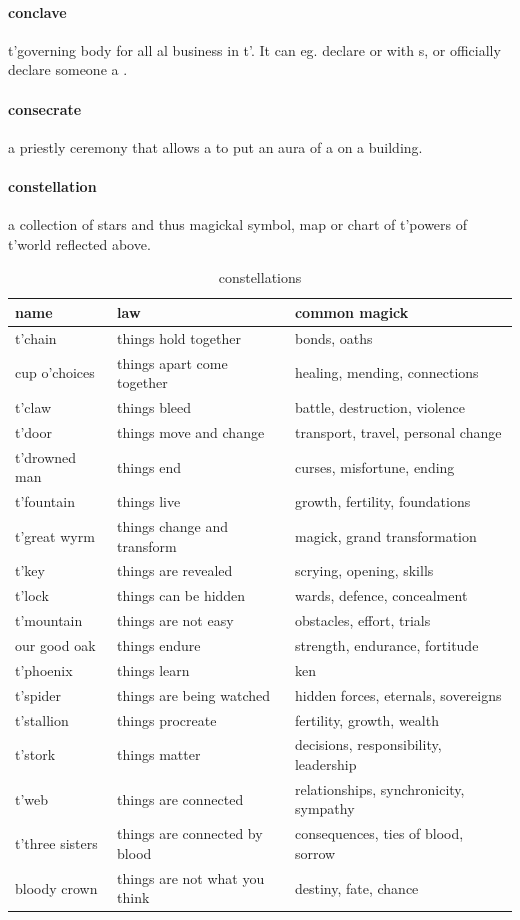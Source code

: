 \paragraph{conclave} t'\allowbreak governing body for all al business in t'\allowbreak {}. It can eg. declare  or  with s, or officially declare someone a .
\paragraph{consecrate} a priestly ceremony that allows a  to put an aura of a  on a building.
\paragraph{constellation} a collection of stars and thus magickal symbol, map or chart of t'\allowbreak powers of t'\allowbreak world reflected above. \begin{table}\centering \begin{tabular}{lp{}p{}} name& law& common magick\\ \hline t'\allowbreak chain & things hold together & bonds, oaths \\ cup o'choices & things apart come together & healing, mending, connections \\ t'\allowbreak claw & things bleed & battle, destruction, violence \\ t'\allowbreak door & things move and change & transport, travel, personal change \\ t'\allowbreak drowned man & things end & curses, misfortune, ending \\ t'\allowbreak fountain & things live & growth, fertility, foundations \\ t'\allowbreak great wyrm & things change and transform & magick, grand transformation \\ t'\allowbreak key & things are revealed & scrying, opening, skills \\ t'\allowbreak lock & things can be hidden & wards, defence, concealment \\ t'\allowbreak mountain & things are not easy & obstacles, effort, trials \\ our good oak & things endure & strength, endurance, fortitude \\ t'\allowbreak phoenix & things learn & ken \\ t'\allowbreak spider & things are being watched & hidden forces, eternals, sovereigns \\ t'\allowbreak stallion & things procreate & fertility, growth, wealth \\ t'\allowbreak stork & things matter & decisions, responsibility, leadership \\ t'\allowbreak web & things are connected & relationships, synchronicity, sympathy \\ t'\allowbreak three sisters & things are connected by blood & consequences, ties of blood, sorrow \\ bloody crown & things are not what you think & destiny, fate, chance \end{tabular} \caption{constellations} \end{table}
